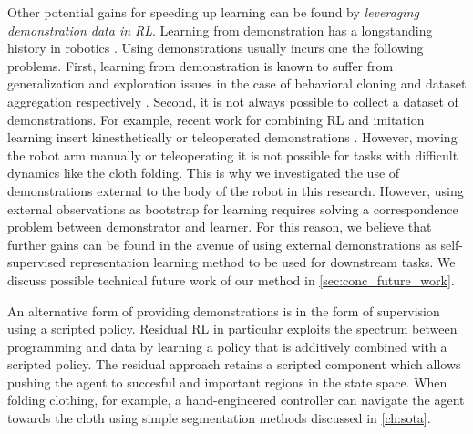 \documentclass[\home/main.tex]{subfiles}
\begin{document}
Other potential gains for speeding up learning can be found by \emph{leveraging demonstration data in RL}. 
Learning from demonstration has a longstanding history in robotics \autocite{Argall2009}. Using demonstrations usually incurs one the following problems. 
First, learning from demonstration is known to suffer from generalization and exploration issues in the case of behavioral cloning and dataset aggregation respectively \autocite{Ibarz2021}.
Second, it is not always possible to collect a dataset of demonstrations. For example, recent work for combining RL and imitation learning insert kinesthetically \autocite{vecerik2018leveraging} or teleoperated demonstrations \autocite{Zhu-RSS-18}. However, moving the robot arm manually or teleoperating it is not possible for tasks with difficult dynamics like the cloth folding. This is why we investigated the use of demonstrations external to the body of the robot in this research. However, using external observations as bootstrap for learning requires solving a correspondence problem between demonstrator and learner. For this reason, we believe that further gains can be found in the avenue of using external demonstrations as self-supervised representation learning method to be used for downstream tasks. We discuss possible technical future work of our method in \cref{sec:conc_future_work}. 

An alternative form of providing demonstrations is in the form of supervision using a scripted policy. Residual RL in particular exploits the spectrum between programming and data by learning a policy that is additively combined with a scripted policy. The residual approach retains a scripted component which allows pushing the agent to succesful and important regions in the state space. When folding clothing, for example, a hand-engineered controller can navigate the agent towards the cloth using simple segmentation methods discussed in \cref{ch:sota}. 
\end{document}
